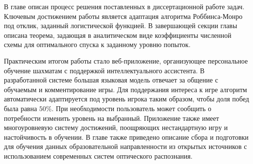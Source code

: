 В главе описан процесс решения поставленных в  диссертационной работе задач. Ключевым достижением работы является адаптация алгоритма Роббинса-Монро под отклик, 
заданный логистической функцией. В завершающей секции главы описана теорема, задающая в аналитическом виде коэффициенты численной схемы для оптимального 
спуска к заданному уровню попыток. 

Практическим итогом работы стало веб-приложение, организующее персональное обучение шахматам с поддержкой интеллектуального ассистента.
В разработанной системе большая языковая модель отвечает за общение с обучаемым и комментирование игры. Для поддержания интереса к игре алгоритм автоматически 
адаптируется под уровень игрока таким образом, чтобы доля побед была равна $50\%$. При необходимости пользователь 
может сообщить о потребности изменить уровень на выбранный. Приложение также имеет многоуровневую систему достижений, поощряющих 
нестандартную игру и настойчивость в обучении. 
В главе также приведено описание сбора и подготовки для обучения данных образовательной направленности из открытых источников с использованием современных
систем оптического распознания. 










